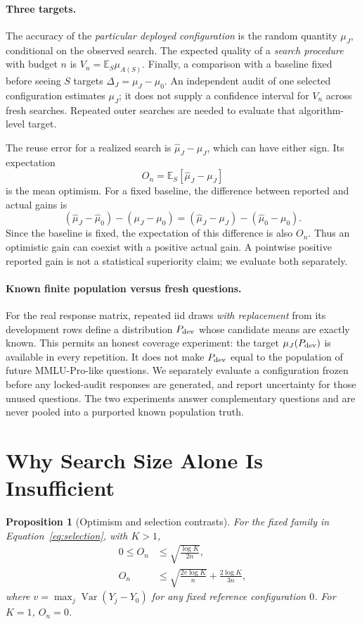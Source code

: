 \documentclass{article}
\newtheorem{proposition}{Proposition}
\newcommand{\E}{\mathbb{E}}
\newcommand{\muh}{\widehat\mu}
\begin{document}
\paragraph{Three targets.}
The accuracy of the \emph{particular deployed configuration} is the random quantity $\mu_J$, conditional on the observed search. The expected quality of a \emph{search procedure} with budget $n$ is $V_n=\E_S\mu_{A(S)}$. Finally, a comparison with a baseline fixed before seeing $S$ targets $\Delta_J=\mu_J-\mu_0$. An independent audit of one selected configuration estimates $\mu_J$; it does not supply a confidence interval for $V_n$ across fresh searches. Repeated outer searches are needed to evaluate that algorithm-level target.

The reuse error for a realized search is $\muh_J-\mu_J$, which can have either sign. Its expectation
\begin{equation}
 O_n=\E_S[\muh_J-\mu_J]
 \label{eq:optimism}
\end{equation}
is the mean optimism. For a fixed baseline, the difference between reported and actual gains is
\begin{equation}
 (\muh_J-\muh_0)-(\mu_J-\mu_0)
 =(\muh_J-\mu_J)-(\muh_0-\mu_0).
 \label{eq:gains}
\end{equation}
Since the baseline is fixed, the expectation of this difference is also $O_n$. Thus an optimistic gain can coexist with a positive actual gain. A pointwise positive reported gain is not a statistical superiority claim; we evaluate both separately.

\paragraph{Known finite population versus fresh questions.}
For the real response matrix, repeated iid draws \emph{with replacement} from its development rows define a distribution $P_{\rm dev}$ whose candidate means are exactly known. This permits an honest coverage experiment: the target $\mu_J(P_{\rm dev})$ is available in every repetition. It does not make $P_{\rm dev}$ equal to the population of future MMLU-Pro-like questions. We separately evaluate a configuration frozen before any locked-audit responses are generated, and report uncertainty for those unused questions. The two experiments answer complementary questions and are never pooled into a purported known population truth.

\section{Why Search Size Alone Is Insufficient}
\begin{proposition}[Optimism and selection contrasts]
For the fixed family in Equation~\eqref{eq:selection}, with $K>1$,
\begin{align}
 0\leq O_n &\leq \sqrt{\frac{\log K}{2n}}, \label{eq:hoeffding}\\
 O_n &\leq \sqrt{\frac{2v\log K}{n}}
            +\frac{2\log K}{3n},\label{eq:contrast}
\end{align}
where $v=\max_j\operatorname{Var}(Y_j-Y_0)$ for any fixed reference configuration $0$. For $K=1$, $O_n=0$.
\end{proposition}
\end{document}
